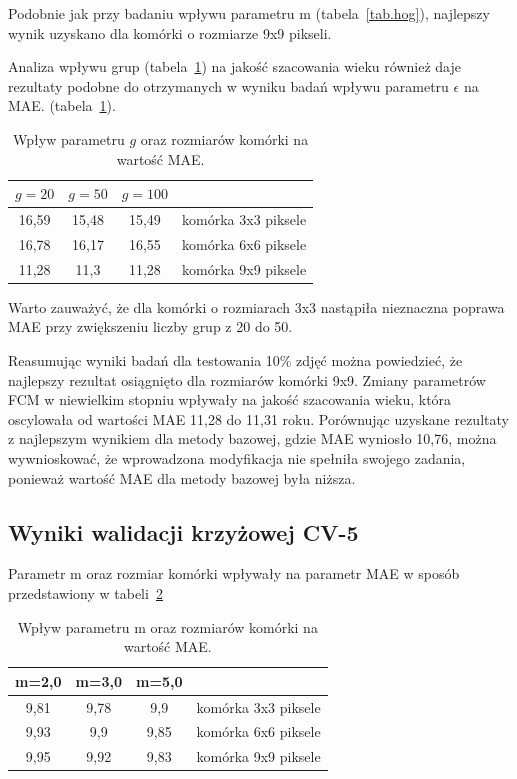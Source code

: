\documentclass[a4paper,twoside,12pt]{book}
\begin{document}
    Podobnie jak przy badaniu wpływu parametru m (tabela~\ref{tab.hog}), najlepszy wynik uzyskano dla komórki o
    rozmiarze 9x9 pikseli.

    Analiza wpływu grup (tabela~\ref{tab.hog2}) na jakość szacowania wieku również daje rezultaty podobne do otrzymanych
    w wyniku badań wpływu parametru $\epsilon$ na MAE.
    (tabela~\ref{tab.hog2}).
    \begin{table}[h!]
        \centering
        \caption{Wpływ parametru $g$ oraz rozmiarów komórki na wartość MAE.}
        \begin{tabular}{|c|c|c|c|}
            \hline
            $g=20$ & $g=50$ & $g=100$ &                     \\ \hline
            16,59 & 15,48 & 15,49 & komórka 3x3 piksele \\ \hline
            16,78 & 16,17 & 16,55 & komórka 6x6 piksele \\ \hline
            11,28 & 11,3 & 11,28 & komórka 9x9 piksele \\ \hline
        \end{tabular}
        \label{tab.hog2}
    \end{table}

    Warto zauważyć, że dla komórki o rozmiarach 3x3 nastąpiła nieznaczna poprawa MAE przy zwiększeniu liczby grup z
    20 do
    50.

    Reasumując wyniki badań dla testowania 10\% zdjęć można powiedzieć, że najlepszy rezultat osiągnięto dla
    rozmiarów komórki 9x9. Zmiany parametrów FCM w niewielkim stopniu wpływały na jakość szacowania wieku, która
    oscylowała
    od wartości MAE 11,28 do 11,31 roku.
    Porównując uzyskane rezultaty z najlepszym wynikiem dla metody bazowej, gdzie MAE wyniosło 10,76, można
    wywnioskować, że wprowadzona modyfikacja nie spełniła swojego zadania, ponieważ wartość MAE
    dla metody bazowej była niższa.
    \subsection*{Wyniki walidacji krzyżowej CV-5}
    Parametr m oraz rozmiar komórki wpływały na parametr MAE w sposób przedstawiony w tabeli~\ref{tab.hog11}
    \begin{table}[h!]
        \centering
        \caption{Wpływ parametru m oraz rozmiarów komórki na wartość MAE.}
        \begin{tabular}{|c|c|c|c|}
            \hline
            m=2,0 & m=3,0 & m=5,0 &                     \\ \hline
            9,81 & 9,78 & 9,9 & komórka 3x3 piksele \\ \hline
            9,93 & 9,9 & 9,85 & komórka 6x6 piksele \\ \hline
            9,95 & 9,92 & 9,83 & komórka 9x9 piksele \\ \hline
        \end{tabular}
        \label{tab.hog11}
    \end{table}
\end{document}
